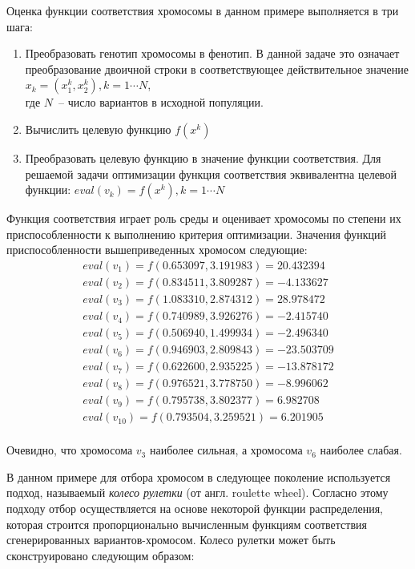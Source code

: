 Оценка функции соответствия хромосомы в данном примере выполняется в три шага:
\begin{enumerate}
  \item{Преобразовать генотип хромосомы в фенотип. В данной задаче это означает преобразование двоичной
    строки в соответствующее действительное значение $x_{k} = (x_{1}^{k}, x_{2}^{k}), k = 1 \cdots N$, \\
    где $N$~-- число вариантов в исходной популяции.}
  \item{Вычислить целевую функцию $f(x^k)$}
  \item{Преобразовать целевую функцию в значение функции соответствия. Для решаемой задачи оптимизации 
    функция соответствия эквивалентна целевой функции: $eval(v_k) = f(x^k), k = 1 \cdots N$}
\end{enumerate}

Функция соответствия играет роль среды и оценивает хромосомы по степени их приспособленности к
выполнению критерия оптимизации. Значения функций приспособленности вышеприведенных хромосом
следующие:
\begin{equation*}
  \begin{array}{l}
    eval(v_1) = f(0.653097, 3.191983) = 20.432394 \\
    eval(v_2) = f(0.834511, 3.809287) = -4.133627 \\
    eval(v_3) = f(1.083310, 2.874312) = 28.978472 \\
    eval(v_4) = f(0.740989, 3.926276) = -2.415740 \\
    eval(v_5) = f(0.506940, 1.499934) = -2.496340 \\
    eval(v_6) = f(0.946903, 2.809843) = -23.503709 \\
    eval(v_7) = f(0.622600, 2.935225) = -13.878172 \\
    eval(v_8) = f(0.976521, 3.778750) = -8.996062 \\
    eval(v_9) = f(0.795738, 3.802377) = 6.982708 \\
    eval(v_{10}) = f(0.793504, 3.259521) = 6.201905 \\
  \end{array}
\end{equation*}

Очевидно, что хромосома $v_3$ наиболее сильная, а хромосома $v_6$ наиболее слабая.

В данном примере для отбора хромосом в следующее поколение используется подход, называемый
{\it колесо рулетки} (от англ. roulette wheel). Согласно этому подходу отбор осуществляется на основе
некоторой функции распределения, которая строится пропорционально вычисленным функциям соответствия
сгенерированных вариантов-хромосом. Колесо рулетки может быть сконструировано следующим образом:

